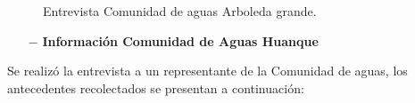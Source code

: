 \documentclass[]{article}
\begin{document}
\begin{figure} [H]
	\caption{Entrevista Comunidad de aguas Arboleda grande.}
\end{figure}
\clearpage
\begin{itemize}
	\item[$-$] \textbf{Información Comunidad de Aguas Huanque}
\end{itemize}

Se realizó la entrevista a un representante de la Comunidad de aguas, los antecedentes recolectados se presentan a continuación:
\end{document}
